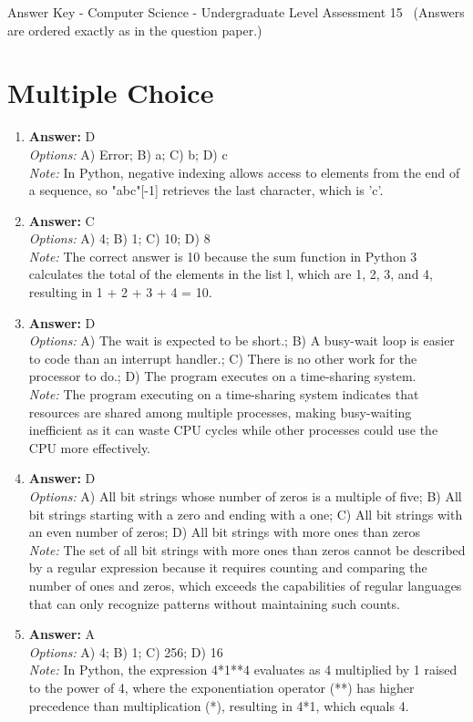 \documentclass[12pt]{article}
\begin{document}
\begin{center}
Answer Key - Computer Science - Undergraduate Level Assessment 15 \
\small (Answers are ordered exactly as in the question paper.)
\end{center}

\section*{Multiple Choice}
\begin{enumerate}[label=\arabic*.]
\item \textbf{Answer:} D
\\ \textit{Options:} A) Error; B) a; C) b; D) c
\\ \textit{Note:} In Python, negative indexing allows access to elements from the end of a sequence, so "abc"[-1] retrieves the last character, which is 'c'.
\item \textbf{Answer:} C
\\ \textit{Options:} A) 4; B) 1; C) 10; D) 8
\\ \textit{Note:} The correct answer is 10 because the sum function in Python 3 calculates the total of the elements in the list l, which are 1, 2, 3, and 4, resulting in 1 + 2 + 3 + 4 = 10.
\item \textbf{Answer:} D
\\ \textit{Options:} A) The wait is expected to be short.; B) A busy-wait loop is easier to code than an interrupt handler.; C) There is no other work for the processor to do.; D) The program executes on a time-sharing system.
\\ \textit{Note:} The program executing on a time-sharing system indicates that resources are shared among multiple processes, making busy-waiting inefficient as it can waste CPU cycles while other processes could use the CPU more effectively.
\item \textbf{Answer:} D
\\ \textit{Options:} A) All bit strings whose number of zeros is a multiple of five; B) All bit strings starting with a zero and ending with a one; C) All bit strings with an even number of zeros; D) All bit strings with more ones than zeros
\\ \textit{Note:} The set of all bit strings with more ones than zeros cannot be described by a regular expression because it requires counting and comparing the number of ones and zeros, which exceeds the capabilities of regular languages that can only recognize patterns without maintaining such counts.
\item \textbf{Answer:} A
\\ \textit{Options:} A) 4; B) 1; C) 256; D) 16
\\ \textit{Note:} In Python, the expression 4*1**4 evaluates as 4 multiplied by 1 raised to the power of 4, where the exponentiation operator (**) has higher precedence than multiplication (*), resulting in 4*1, which equals 4.
\end{enumerate}
\end{document}
